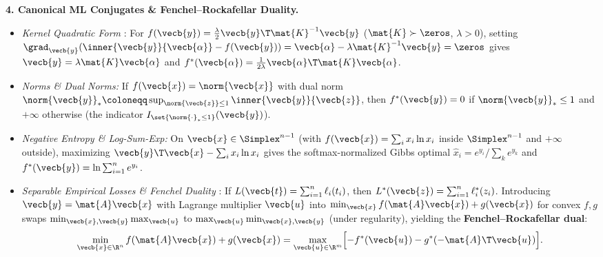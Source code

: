 \documentclass[../../../../master.tex]{subfiles}
\begin{document}
\begin{coremath}
\textbf{4. Canonical ML Conjugates \& Fenchel--Rockafellar Duality.}
\begin{itemize}[leftmargin=1.4em]
  \item \emph{Kernel Quadratic Form} : For $f(\vecb{y}) = \frac{\lambda}{2}\vecb{y}\T\mat{K}^{-1}\vecb{y}$ ($\mat{K} \succ \zeros$, $\lambda > 0$), setting $\grad_{\vecb{y}}(\inner{\vecb{y}}{\vecb{\alpha}} - f(\vecb{y})) = \vecb{\alpha} - \lambda\mat{K}^{-1}\vecb{y} = \zeros$ gives $\vecb{y} = \lambda \mat{K}\vecb{\alpha}$ and $f^*(\vecb{\alpha}) = \frac{1}{2\lambda}\vecb{\alpha}\T\mat{K}\vecb{\alpha}$.
  \item \emph{Norms \& Dual Norms:} If $f(\vecb{x}) = \norm{\vecb{x}}$ with dual norm $\norm{\vecb{y}}_* \coloneqq \sup_{\norm{\vecb{z}}\le 1}\inner{\vecb{y}}{\vecb{z}}$, then $f^*(\vecb{y}) = 0$ if $\norm{\vecb{y}}_* \le 1$ and $+\infty$ otherwise (the indicator $I_{\set{\norm{\cdot}_*\le 1}}(\vecb{y})$).
  \item \emph{Negative Entropy \& Log-Sum-Exp:} On $\vecb{x} \in \Simplex^{n-1}$ (with $f(\vecb{x}) = \sum_i x_i \ln x_i$ inside $\Simplex^{n-1}$ and $+\infty$ outside), maximizing $\vecb{y}\T\vecb{x} - \sum_i x_i \ln x_i$ gives the softmax-normalized Gibbs optimal $\hat{x}_i = e^{y_i}/\sum_k e^{y_k}$ and $f^*(\vecb{y}) = \ln \sum_{i=1}^n e^{y_i}$.
  \item \emph{Separable Empirical Losses \& Fenchel Duality} : If $L(\vecb{t}) = \sum_{i=1}^n \ell_i(t_i)$, then $L^*(\vecb{z}) = \sum_{i=1}^n \ell_i^*(z_i)$. Introducing $\vecb{y} = \mat{A}\vecb{x}$ with Lagrange multiplier $\vecb{u}$ into $\min_{\vecb{x}} f(\mat{A}\vecb{x}) + g(\vecb{x})$ for convex $f, g$ swaps $\min_{\vecb{x},\vecb{y}}\max_{\vecb{u}}$ to $\max_{\vecb{u}}\min_{\vecb{x},\vecb{y}}$ (under regularity), yielding the \textbf{Fenchel--Rockafellar dual}:
  \begin{equation}
    \min_{\vecb{x} \in \R^n} f(\mat{A}\vecb{x}) + g(\vecb{x})
    = \max_{\vecb{u} \in \R^m} \Bigl[ -f^*(\vecb{u}) - g^*(-\mat{A}\T\vecb{u}) \Bigr].
    \label{eq:convex:fenchel_rockafellar}
  \end{equation}
\end{itemize}
\end{coremath}
\end{document}
